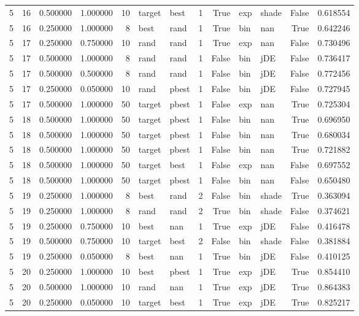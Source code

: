 \begin{tabular}{rrrrrllrrllrr}
5 & 16 & 0.500000 & 1.000000 & 10 & target & best & 1 & True & exp & shade & False & 0.618554 \\
5 & 16 & 0.250000 & 1.000000 & 8 & best & rand & 1 & True & bin & nan & True & 0.642246 \\
5 & 17 & 0.250000 & 0.750000 & 10 & rand & rand & 1 & True & exp & nan & False & 0.730496 \\
5 & 17 & 0.500000 & 1.000000 & 8 & rand & rand & 1 & False & bin & jDE & False & 0.736417 \\
5 & 17 & 0.500000 & 0.500000 & 8 & rand & rand & 1 & False & bin & jDE & False & 0.772456 \\
5 & 17 & 0.250000 & 0.050000 & 10 & rand & pbest & 1 & False & bin & jDE & False & 0.727945 \\
5 & 17 & 0.500000 & 1.000000 & 50 & target & pbest & 1 & False & exp & nan & True & 0.725304 \\
5 & 18 & 0.500000 & 1.000000 & 50 & target & pbest & 1 & False & bin & nan & True & 0.696950 \\
5 & 18 & 0.500000 & 1.000000 & 50 & target & pbest & 1 & False & bin & nan & True & 0.680034 \\
5 & 18 & 0.500000 & 1.000000 & 50 & target & pbest & 1 & False & bin & nan & True & 0.721882 \\
5 & 18 & 0.500000 & 1.000000 & 50 & target & best & 1 & False & exp & nan & False & 0.697552 \\
5 & 18 & 0.500000 & 1.000000 & 50 & target & pbest & 1 & False & bin & nan & False & 0.650480 \\
5 & 19 & 0.250000 & 1.000000 & 8 & best & rand & 2 & False & bin & shade & True & 0.363094 \\
5 & 19 & 0.250000 & 1.000000 & 8 & rand & rand & 2 & True & bin & shade & False & 0.374621 \\
5 & 19 & 0.250000 & 0.750000 & 10 & best & nan & 1 & True & exp & jDE & False & 0.416478 \\
5 & 19 & 0.500000 & 0.750000 & 10 & target & best & 2 & False & bin & shade & False & 0.381884 \\
5 & 19 & 0.250000 & 0.050000 & 8 & best & nan & 1 & True & bin & jDE & False & 0.410125 \\
5 & 20 & 0.250000 & 1.000000 & 10 & best & pbest & 1 & True & exp & jDE & True & 0.854410 \\
5 & 20 & 0.500000 & 1.000000 & 10 & rand & nan & 1 & True & exp & jDE & True & 0.864383 \\
5 & 20 & 0.250000 & 0.050000 & 10 & target & best & 1 & True & exp & jDE & True & 0.825217 \\

\end{tabular}
